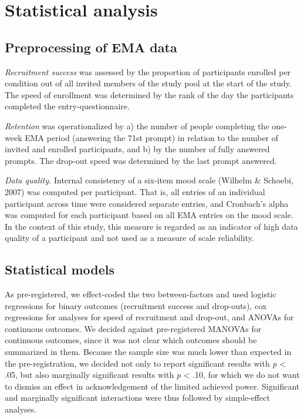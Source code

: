 \documentclass[authordate, empirical,issue]{jote-new-article}
\begin{document}
	\section{Statistical analysis}



	\subsection{Preprocessing of EMA data}



	\emph{Recruitment success} was assessed by the proportion of participants enrolled per condition out of all invited members of the study pool at the start of the study. The speed of enrollment was determined by the rank of the day the participants completed the entry-questionnaire.



	\emph{Retention }was operationalized by a) the number of people completing the one-week EMA period (answering the 71st prompt) in relation to the number of invited and enrolled participants, and b) by the number of fully answered prompts. The drop-out speed was determined by the last prompt answered.



	\emph{Data quality. }Internal consistency of a six-item mood scale (Wilhelm \& Schoebi, 2007) was computed per participant. That is, all entries of an individual participant across time were considered separate entries, and Cronbach's alpha was computed for each participant based on all EMA entries on the mood scale. In the context of this study, this measure is regarded as an indicator of high data quality of a participant and not used as a measure of scale reliability.



	\subsection{Statistical models}



	As pre-registered, we effect-coded the two between-factors and used logistic regressions for binary outcomes (recruitment success and drop-outs), cox regressions for analyses for speed of recruitment and drop-out, and ANOVAs for continuous outcomes. We decided against pre-registered MANOVAs for continuous outcomes, since it was not clear which outcomes should be summarized in them. Because the sample size was much lower than expected in the pre-registration, we decided not only to report significant results with \emph{p} < .05, but also marginally significant results with \emph{p} < .10, for which we do not want to dismiss an effect in acknowledgement of the limited achieved power. Significant and marginally significant interactions were thus followed by simple-effect analyses.
\end{document}
